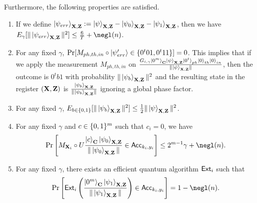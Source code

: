 \begin{lemma}
Furthermore, the following properties are satisfied.
%
\begin{enumerate}
    \item If we define $\ket{\psi_{err}}_{\mathbf{X},\mathbf{Z}}:= \ket{\psi}_{\mathbf{X},\mathbf{Z}} - \ket{\psi_{0}}_{\mathbf{X},\mathbf{Z}}- \ket{\psi_{1}}_{\mathbf{X},\mathbf{Z}}$, then we have  $E_{\gamma}[\|\ket{\psi_{err}}_{\regX,\regZ}\|^2]\leq \frac{6}{T}+\negl(n)$.
\item For any fixed $\gamma$, $\Pr[M_{ph,th,in}\circ \ket{\psi'_{err}} \in \{0^t01,0^t11\}] =0$. %
This implies that if we apply the measurement $M_{ph,th,in}$ on $\frac{G_{i,\gamma} \ket{0^m}_{\mathbf{C}}\ket{\psi}_{\mathbf{X},\mathbf{Z}}\ket{0^t}_{ph}\ket{0}_{th}\ket{0}_{in}}{\|\ket{\psi}_{\mathbf{X},\mathbf{Z}}\|}$, then the outcome is $0^tb1$ with probability $\|\ket{\psi_b}_{\mathbf{X},\mathbf{Z}}\|^2$ and the resulting state in the register $(\mathbf{X},\mathbf{Z})$  is $\frac{\ket{\psi_b}_{\mathbf{X},\mathbf{Z}}}{\|\ket{\psi_b}_{\mathbf{X},\mathbf{Z}}\|}$ ignoring a global phase factor.
    \item For any fixed $\gamma$, $E_{b\in \{0,1\}} [\|\ket{\psi_b}_{\mathbf{X},\mathbf{Z}}\|^2]\leq \frac{1}{2}\|\ket{\psi}_{\mathbf{X},\mathbf{Z}}\|^2$. 
        \item 
For any fixed $\gamma$ and $c\in \{0,1\}^m$ such that $c_i=0$, we have 
\begin{align*}
\Pr\left[M_{\regX_i}\circ U\frac{\ket{c}_{\regC}\ket{\psi_0}_{\regX,\regZ}}{\|\ket{\psi_0}_{\regX,\regZ}\|}\in \Acc_{k_i,y_i}\right]\leq 2^{m-1}\gamma+\negl(\secpar).
\end{align*}
    \item 
For any fixed $\gamma$, there exists an efficient quantum algorithm $\mathsf{Ext}_i$ such that 
\begin{align*}  
  \Pr\left[\ext_i\left(\frac{\ket{0^m}_{\regC}\ket{\psi_1}_{\regX,\regZ}}{\|\ket{\psi_1}_{\regX,\regZ}\|}\right)\in \Acc_{k_i,y_i}\right]=1-\negl(\secpar).
  \end{align*}   
\end{enumerate}
\end{lemma}

